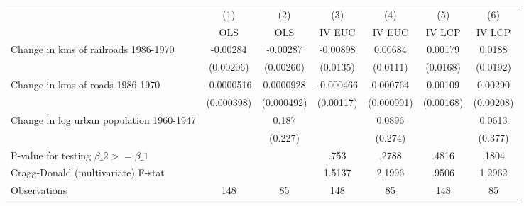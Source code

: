{
\def\sym#1{\ifmmode^{#1}\else\(^{#1}\)\fi}
\begin{tabular}{l*{6}{c}}
\hline\hline
                &\multicolumn{1}{c}{(1)}&\multicolumn{1}{c}{(2)}&\multicolumn{1}{c}{(3)}&\multicolumn{1}{c}{(4)}&\multicolumn{1}{c}{(5)}&\multicolumn{1}{c}{(6)}\\
                &\multicolumn{1}{c}{OLS}&\multicolumn{1}{c}{OLS}&\multicolumn{1}{c}{IV EUC}&\multicolumn{1}{c}{IV EUC}&\multicolumn{1}{c}{IV LCP}&\multicolumn{1}{c}{IV LCP}\\
\hline
Change in kms of railroads 1986-1970& -0.00284         & -0.00287         & -0.00898         &  0.00684         &  0.00179         &   0.0188         \\
                &(0.00206)         &(0.00260)         & (0.0135)         & (0.0111)         & (0.0168)         & (0.0192)         \\
[1em]
Change in kms of roads 1986-1970&-0.0000516         &0.0000928         &-0.000466         & 0.000764         &  0.00109         &  0.00290         \\
                &(0.000398)         &(0.000492)         &(0.00117)         &(0.000991)         &(0.00168)         &(0.00208)         \\
[1em]
Change in log urban population 1960-1947&                  &    0.187         &                  &   0.0896         &                  &   0.0613         \\
                &                  &  (0.227)         &                  &  (0.274)         &                  &  (0.377)         \\
\hline
P-value for testing $\beta\_{2} >= \beta\_{1}$&                  &                  &     .753         &    .2788         &    .4816         &    .1804         \\
Cragg-Donald (multivariate) F-stat&                  &                  &   1.5137         &   2.1996         &    .9506         &   1.2962         \\
Observations    &      148         &       85         &      148         &       85         &      148         &       85         \\
\hline\hline
\end{tabular}
}
